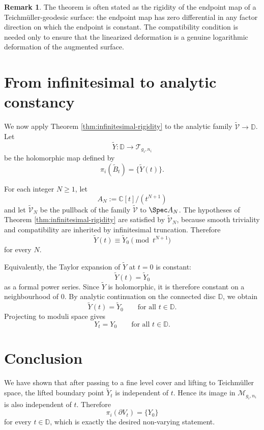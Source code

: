 \documentclass[11pt]{article}
\theoremstyle{plain}
\theoremstyle{definition}
\newtheorem{remark}[theorem]{Remark}
\newcommand{\M}{\mathcal M}
\newcommand{\T}{\mathcal T}
\newcommand{\C}{\mathbb C}
\newcommand{\D}{\mathbb D}
\newcommand{\cV}{\mathcal V}
\begin{document}
\begin{remark}
The theorem is often stated as the rigidity of the endpoint map of a Teichm\"uller-geodesic surface: the endpoint map has zero differential in any factor direction on which the endpoint is constant.  The compatibility condition is needed only to ensure that the linearized deformation is a genuine logarithmic deformation of the augmented surface.
\end{remark}

\section{From infinitesimal to analytic constancy}

We now apply Theorem \ref{thm:infinitesimal-rigidity} to the analytic family \(\widetilde{\cV}\to \D\).  Let
\[
\widetilde Y:\D\longrightarrow \T_{g_{i},n_{i}}
\]
be the holomorphic map defined by
\[
\pi_{i}(\widetilde B_{t})=\{\widetilde Y(t)\}.
\]

For each integer \(N\geq 1\), let
\[
A_{N}:=\C[t]/(t^{N+1})
\]
and let \(\widetilde{\cV}_{N}\) be the pullback of the family \(\widetilde{\cV}\) to \(\Spec A_{N}\).  The hypotheses of Theorem \ref{thm:infinitesimal-rigidity} are satisfied by \(\widetilde{\cV}_{N}\), because smooth triviality and compatibility are inherited by infinitesimal truncation.  Therefore
\[
\widetilde Y(t)\equiv \widetilde Y_{0}\pmod{t^{N+1}}
\]
for every \(N\).

Equivalently, the Taylor expansion of \(\widetilde Y\) at \(t=0\) is constant:
\[
\widetilde Y(t)=\widetilde Y_{0}
\]
as a formal power series.  Since \(\widetilde Y\) is holomorphic, it is therefore constant on a neighbourhood of \(0\).  By analytic continuation on the connected disc \(\D\), we obtain
\[
\widetilde Y(t)=\widetilde Y_{0}\qquad\text{for all }t\in \D.
\]
Projecting to moduli space gives
\[
Y_{t}=Y_{0}\qquad\text{for all }t\in \D.
\]

\section{Conclusion}

We have shown that after passing to a fine level cover and lifting to Teichm\"uller space, the lifted boundary point \(\widetilde Y_{t}\) is independent of \(t\).  Hence its image in \(\M_{g_{i},n_{i}}\) is also independent of \(t\).  Therefore
\[
\pi_{i}(\partial V_{t})=\{Y_{0}\}
\]
for every \(t\in\D\), which is exactly the desired non-varying statement.
\end{document}
